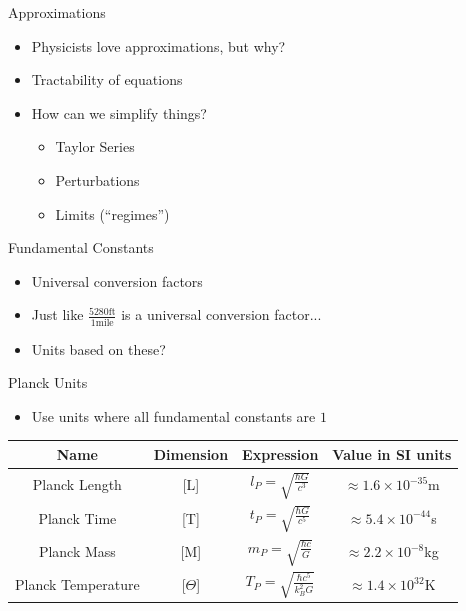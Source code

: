 \documentclass[10pt,xcolor={table,dvipsnames},t]{beamer}
\begin{document}
\begin{frame}{Approximations}
    \begin{itemize}
        \item Physicists love approximations, but why?
        \item Tractability of equations
        \item How can we simplify things?
        \begin{itemize}
            \item Taylor Series
            \item Perturbations
            \item Limits (``regimes'')
        \end{itemize}
    \end{itemize}
\end{frame}

\begin{frame}{Fundamental Constants}
    \begin{itemize}
        \item Universal conversion factors
        \item Just like $\frac{5280 \textrm{ft}}{1 \textrm{mile}}$ is a universal conversion factor...
        \item Units based on these?
    \end{itemize}
\end{frame}

\begin{frame}{Planck Units}
    \begin{itemize}
        \item Use units where all fundamental constants are $1$
    \end{itemize}
    
    \begin{tabular}{|c|c|c|c|}
        \hline 
        Name & Dimension & Expression & Value in SI units  \\
        \hline
        \hline
        Planck Length & [L] & $l_P = \sqrt{\frac{\hbar G}{c^3}}$ & $\approx 1.6 \times 10^{-35}$m \\
        Planck Time & [T] & $t_P = \sqrt{\frac{\hbar G}{c^5}}$ & $\approx 5.4 \times 10^{-44}$s \\
        Planck Mass & [M] & $m_P = \sqrt{\frac{\hbar c}{G}}$ & $\approx 2.2 \times 10^{-8}$kg \\
        Planck Temperature & [$\Theta$] & $T_P = \sqrt{\frac{\hbar c^5}{k_B^2 G}}$ & $\approx 1.4 \times 10^{32}$K \\
        \hline
    \end{tabular}
\end{frame}
\end{document}
